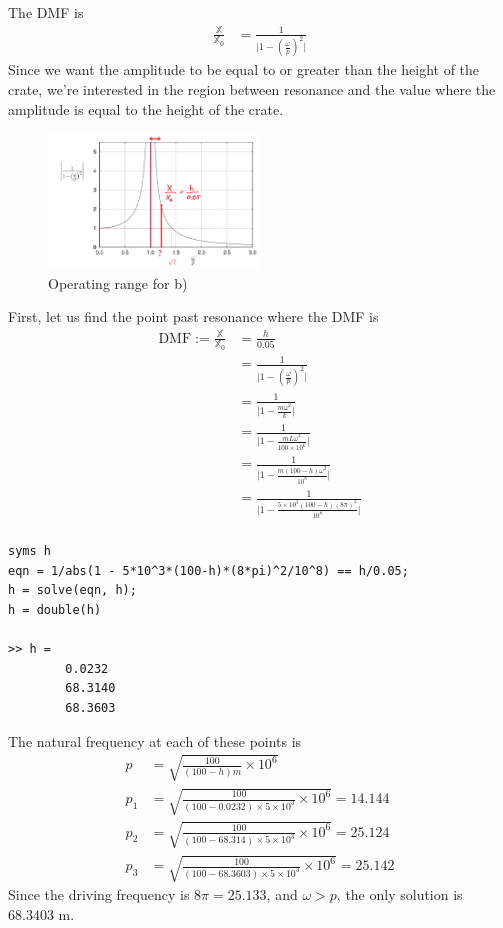 \subsection{}
The DMF is
\begin{align*}
    \frac{\mathbb{X}}{\mathbb{X}_0} &= \frac{1}{\bigg| 1 - \left(\frac{\omega}{p}\right)^2 \bigg|}
\end{align*}
Since we want the amplitude to be equal to or greater than the height of the crate, we're interested in the region between resonance and the value where the amplitude is equal to the height of the crate. 
\begin{figure}[h]
    \centering
    \includegraphics[width=0.5\textwidth]{Questions/Figures/q2 dmf.png}
    \caption{Operating range for b)}
\end{figure}
First, let us find the point past resonance where the DMF is 
\begin{align*}
    \text{DMF} := \frac{\mathbb{X}}{\mathbb{X}_0} &= \frac{h}{0.05} \\
    &= \frac{1}{\bigg| 1 - \left(\frac{\omega}{p}\right)^2 \bigg|} \\
    &= \frac{1}{\bigg| 1 - \frac{m\omega^2}{k} \bigg|} \\
    &= \frac{1}{\bigg| 1 - \frac{mL\omega^2}{100 \times 10^6} \bigg|} \\
    &= \frac{1}{\bigg| 1 - \frac{m(100 - h)\omega^2}{10^8} \bigg|} \\
    &= \frac{1}{\bigg| 1 - \frac{5 \times 10^3(100 - h)(8\pi)^2}{10^8} \bigg|} \\
\end{align*}
\begin{verbatim}
syms h
eqn = 1/abs(1 - 5*10^3*(100-h)*(8*pi)^2/10^8) == h/0.05;
h = solve(eqn, h);
h = double(h)

>> h =
        0.0232
        68.3140
        68.3603
\end{verbatim}
The natural frequency at each of these points is
\begin{align*}
    p &= \sqrt{\frac{100}{(100-h)m} \times 10^6} \\
    p_1 &= \sqrt{\frac{100}{(100 - 0.0232) \times 5 \times 10^3} \times 10^6} = 14.144 \\
    p_2 &= \sqrt{\frac{100}{(100 - 68.314) \times 5 \times 10^3} \times 10^6} = 25.124 \\
    p_3 &= \sqrt{\frac{100}{(100 - 68.3603) \times 5 \times 10^3} \times 10^6} = 25.142 
\end{align*}
Since the driving frequency is 8$\pi = 25.133$, and $\omega > p$, the only solution is $68.3403$ m.

